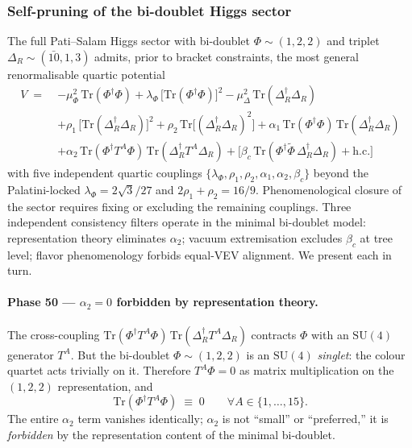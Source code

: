 \documentclass[11pt,a4paper]{article}
\theoremstyle{plain}
\theoremstyle{definition}
\theoremstyle{remark}
\begin{document}
\subsubsection{Self-pruning of the bi-doublet Higgs sector}
\label{sec:self-pruning}

The full Pati--Salam Higgs sector with bi-doublet
$\Phi \sim (1,2,2)$ and triplet $\Delta_R \sim (\bar{10}, 1, 3)$
admits, prior to bracket constraints, the most general renormalisable
quartic potential
\begin{equation}\label{eq:V-prepruning}
\begin{aligned}
  V \;=\;& -\mu_\Phi^2\,\mathrm{Tr}(\Phi^\dagger\Phi)
       + \lambda_\Phi\,\bigl[\mathrm{Tr}(\Phi^\dagger\Phi)\bigr]^2
       - \mu_\Delta^2\,\mathrm{Tr}(\Delta_R^\dagger\Delta_R) \\
       &+ \rho_1\,\bigl[\mathrm{Tr}(\Delta_R^\dagger\Delta_R)\bigr]^2
       + \rho_2\,\mathrm{Tr}\bigl[(\Delta_R^\dagger\Delta_R)^2\bigr]
       + \alpha_1\,\mathrm{Tr}(\Phi^\dagger\Phi)\,\mathrm{Tr}(\Delta_R^\dagger\Delta_R) \\
       &+ \alpha_2\,\mathrm{Tr}(\Phi^\dagger T^A \Phi)\,
         \mathrm{Tr}(\Delta_R^\dagger T^A \Delta_R)
       + \bigl[\beta_c\,\mathrm{Tr}(\Phi^\dagger \tilde{\Phi}\,\Delta_R^\dagger\Delta_R)
       + \mathrm{h.c.}\bigr]
\end{aligned}
\end{equation}
with five independent quartic couplings
$\{\lambda_\Phi, \rho_1, \rho_2, \alpha_1, \alpha_2, \beta_c\}$
beyond the Palatini-locked
$\lambda_\Phi = 2\sqrt{3}/27$ and $2\rho_1 + \rho_2 = 16/9$.
Phenomenological closure of the sector requires fixing or excluding
the remaining couplings.  Three independent consistency filters
operate in the minimal bi-doublet model:
representation theory eliminates $\alpha_2$;
vacuum extremisation excludes $\beta_c$ at tree level;
flavor phenomenology forbids equal-VEV alignment.
We present each in turn.

\paragraph{Phase 50 --- $\alpha_2 = 0$ forbidden by representation theory.}
The cross-coupling
$\mathrm{Tr}(\Phi^\dagger T^A \Phi)\,
 \mathrm{Tr}(\Delta_R^\dagger T^A \Delta_R)$
contracts $\Phi$ with an $\mathrm{SU}(4)$ generator $T^A$.  But the
bi-doublet $\Phi \sim (1, 2, 2)$ is an $\mathrm{SU}(4)$ \emph{singlet}:
the colour quartet acts trivially on it.  Therefore $T^A \Phi = 0$ as
matrix multiplication on the $(1,2,2)$ representation, and
\begin{equation}\label{eq:alpha2-zero}
  \mathrm{Tr}(\Phi^\dagger T^A \Phi) \;\equiv\; 0
  \qquad \forall A \in \{1,\ldots,15\}.
\end{equation}
The entire $\alpha_2$ term vanishes identically; $\alpha_2$ is not
``small'' or ``preferred,'' it is \emph{forbidden} by the representation
content of the minimal bi-doublet.
\end{document}
